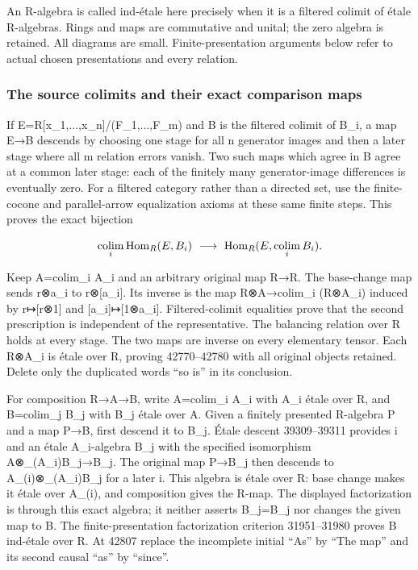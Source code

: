 An R-algebra is called ind-étale here precisely when it is a filtered colimit of étale R-algebras. Rings and maps are commutative and unital; the zero algebra is retained. All diagrams are small. Finite-presentation arguments below refer to actual chosen presentations and every relation.

\subsubsection{The source colimits and their exact comparison maps}\label{algebra-proof-059-the-source-colimits-and-their-exact-comparison-maps}

If E=R{[}x\_1,...,x\_n{]}/(F\_1,...,F\_m) and B is the filtered colimit of B\_i, a map E→B descends by choosing one stage for all n generator images and then a later stage where all m relation errors vanish. Two such maps which agree in B agree at a common later stage: each of the finitely many generator-image differences is eventually zero. For a filtered category rather than a directed set, use the finite-cocone and parallel-arrow equalization axioms at these same finite steps. This proves the exact bijection

\[
\mathop{\rm colim}_i\operatorname{Hom}_R(E,B_i)
\ \longrightarrow\ \operatorname{Hom}_R(E,\mathop{\rm colim}_iB_i).
\]

Keep A=colim\_i A\_i and an arbitrary original map R→R\textquotesingle. The base-change map sends r\textquotesingle⊗a\_i to r\textquotesingle⊗{[}a\_i{]}. Its inverse is the map R\textquotesingle⊗A→colim\_i (R\textquotesingle⊗A\_i) induced by r\textquotesingle↦{[}r\textquotesingle⊗1{]} and {[}a\_i{]}↦{[}1⊗a\_i{]}. Filtered-colimit equalities prove that the second prescription is independent of the representative. The balancing relation over R holds at every stage. The two maps are inverse on every elementary tensor. Each R\textquotesingle⊗A\_i is étale over R\textquotesingle, proving 42770--42780 with all original objects retained. Delete only the duplicated words ``so is'' in its conclusion.

For composition R→A→B, write A=colim\_i A\_i with A\_i étale over R, and B=colim\_j B\_j with B\_j étale over A. Given a finitely presented R-algebra P and a map P→B, first descend it to B\_j. Étale descent 39309--39311 provides i and an étale A\_i-algebra B\textquotesingle\_j with the specified isomorphism A⊗\_(A\_i)B\textquotesingle\_j→B\_j. The original map P→B\_j then descends to A\_(i\textquotesingle)⊗\_(A\_i)B\textquotesingle\_j for a later i\textquotesingle. This algebra is étale over R: base change makes it étale over A\_(i\textquotesingle), and composition gives the R-map. The displayed factorization is through this exact algebra; it neither asserts B\textquotesingle\_j=B\_j nor changes the given map to B. The finite-presentation factorization criterion 31951--31980 proves B ind-étale over R. At 42807 replace the incomplete initial ``As'' by ``The map'' and its second causal ``as'' by ``since''.

